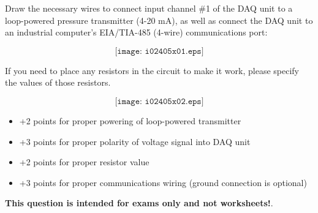 

Draw the necessary wires to connect input channel \#1 of the DAQ unit to a loop-powered pressure transmitter (4-20 mA), as well as connect the DAQ unit to an industrial computer's EIA/TIA-485 (4-wire) communications port:

$$\texttt{[image: i02405x01.eps]}$$

If you need to place any resistors in the circuit to make it work, please specify the values of those resistors.







$$\texttt{[image: i02405x02.eps]}$$

\begin{itemize}
\item{} +2 points for proper powering of loop-powered transmitter
\item{} +3 points for proper polarity of voltage signal into DAQ unit
\item{} +2 points for proper resistor value
\item{} +3 points for proper communications wiring (ground connection is optional)
\end{itemize}







{\bf This question is intended for exams only and not worksheets!}.



